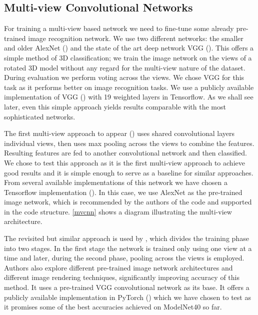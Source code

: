 \subsection{Multi-view Convolutional Networks}
For training a multi-view based network we need to fine-tune some already pre-trained image recognition network. We use two different networks: the smaller and older AlexNet (\cite{krizhevsky_imagenet_2012}) and the state of the art deep network VGG (\cite{simonyan_very_2014}). This offers a simple method of 3D classification; we train the image network on the views of a rotated 3D model without any regard for the multi-view nature of the dataset. During evaluation we perform voting across the views. We chose VGG for this task as it performs better on image recognition tasks. We use a publicly available implementation of VGG (\cite{machrisaa_vgg_2017}) with 19 weighted layers in Tensorflow. As we shall see later, even this simple approach yields results comparable with the most sophisticated networks.
\par
The first multi-view approach to appear (\cite{su_multi-view_2015}) uses shared convolutional layers individual views, then uses max pooling across the views to combine the features. Resulting features are fed to another convolutional network and then classified. We chose to test this approach as it is the first multi-view approach to achieve good results and it is simple enough to serve as a baseline for similar approaches. From several available implementations of this network we have chosen a Tensorflow implementation (\cite{lee_multi-view_2016}). In this case, we use AlexNet as the pre-trained image network, which is recommended by the authors of the code and supported in the code structure. \autoref{mvcnn} shows a diagram illustrating the multi-view architecture. \par
The revisited but similar approach is used by \cite{su_deeper_2018}, which divides the training phase into two stages. In the first stage the network is trained only using one view at a time and later, during the second phase, pooling across the views is employed. Authors also explore different pre-trained image network architectures and different image rendering techniques, significantly improving accuracy of this method. It uses a pre-trained VGG convolutional network as its base. It offers a publicly available implementation in PyTorch (\cite{su_multi-view_2018}) which we have chosen to test as it promises some of the best accuracies achieved on ModelNet40 so far.

